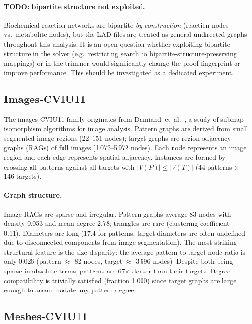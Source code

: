 \documentclass[11pt,a4paper]{article}
\begin{document}
\paragraph{\textbf{TODO:} bipartite structure not exploited.}
Biochemical reaction networks are bipartite \emph{by construction} (reaction nodes vs.\
metabolite nodes), but the LAD files are treated as general undirected graphs throughout this
analysis.
It is an open question whether exploiting bipartite structure in the solver
(e.g.\ restricting search to bipartite-structure-preserving mappings) or in the trimmer
would significantly change the proof fingerprint or improve performance.
This should be investigated as a dedicated experiment.

\subsection{Images-CVIU11}
\label{sec:images}

The images-CVIU11 family originates from Damiand~et~al.~\cite{damiand-solnon-cviu2011}, a study of
submap isomorphism algorithms for image analysis.
Pattern graphs are derived from small segmented image regions (22--151 nodes); target graphs are
region adjacency graphs (RAGs) of full images (1\,072--5\,972 nodes).
Each node represents an image region and each edge represents spatial adjacency.
Instances are formed by crossing all patterns against all targets with $|V(P)| \le |V(T)|$
(44 patterns $\times$ 146 targets).

\paragraph{Graph structure.} Image RAGs are sparse and irregular.
Pattern graphs average 83 nodes with density 0.053 and mean degree 2.78; triangles are rare
(clustering coefficient 0.11).
Diameters are long (17.4 for patterns; target diameters are often undefined due to disconnected
components from image segmentation).
The most striking structural feature is the size disparity: the average pattern-to-target node
ratio is only 0.026 (pattern $\approx$ 82 nodes, target $\approx$ 3\,696 nodes).
Despite both being sparse in absolute terms, patterns are 67$\times$ denser than their targets.
Degree compatibility is trivially satisfied (fraction 1.000) since target graphs are large enough
to accommodate any pattern degree.

\subsection{Meshes-CVIU11}
\label{sec:meshes}
\end{document}

